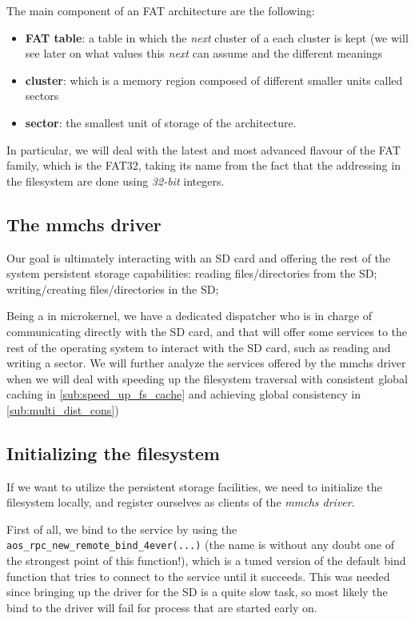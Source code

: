 \documentclass[a4paper,twoside,openright]{report}
\begin{document}
The main component of an FAT architecture are the following:
\begin{itemize}
    \item \textbf{FAT table}: a table in which the \textit{next} cluster of a each cluster is kept (we will see later on what values this \textit{next} can assume and the different meanings
    \item \textbf{cluster}: which is a memory region composed of different smaller units called sectors
    \item \textbf{sector}: the smallest unit of storage of the architecture.
\end{itemize}

In particular, we will deal with the latest and most advanced flavour of the FAT family, which is the FAT32, taking its name from the fact that the addressing in the filesystem are done using \emph{32-bit} integers.

\subsection{The mmchs driver}
Our goal is ultimately interacting with an SD card and offering the rest of the system persistent storage capabilities: reading files/directories from the SD; writing/creating files/directories in the SD;

Being a in microkernel, we have a dedicated dispatcher who is in charge of communicating directly with the SD card, and that will offer some services to the rest of the operating system to interact with the SD card, such as reading and writing a sector.
We will further analyze the services offered by the mmchs driver when we will deal with speeding up the filesystem traversal with consistent global caching in \ref{sub:speed_up_fs_cache} and achieving global consistency in \ref{sub:multi_dist_cons})

\subsection{Initializing the filesystem}
If we want to utilize the persistent storage facilities, we need to initialize the filesystem locally, and register ourselves as clients of the \emph{mmchs driver}.

First of all, we bind to the service by using the \texttt{aos\_rpc\_new\_remote\_bind\_4ever(...)} (the name is without any doubt one of the strongest point of this function!), which is a tuned version of the default bind function that tries to connect to the service until it succeeds.
This was needed since bringing up the driver for the SD is a quite slow task, so most likely the bind to the driver will fail for process that are started early on.
\end{document}
